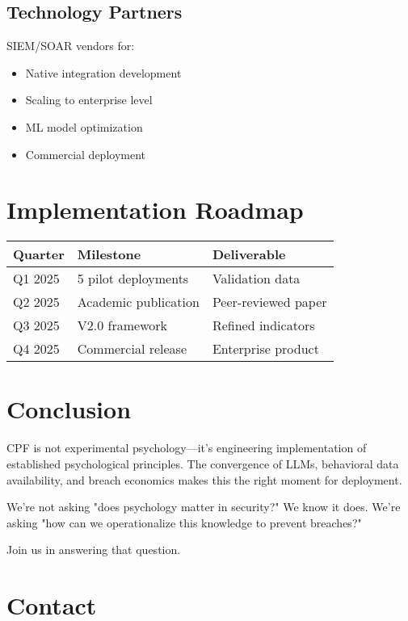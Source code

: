 \documentclass[11pt,a4paper]{article}
\begin{document}
\subsection{Technology Partners}
SIEM/SOAR vendors for:
\begin{itemize}
\item Native integration development
\item Scaling to enterprise level
\item ML model optimization
\item Commercial deployment
\end{itemize}

\section{Implementation Roadmap}

\begin{table}[h]
\centering
\begin{tabular}{|l|l|l|}
\hline
\textbf{Quarter} & \textbf{Milestone} & \textbf{Deliverable} \\
\hline
Q1 2025 & 5 pilot deployments & Validation data \\
Q2 2025 & Academic publication & Peer-reviewed paper \\
Q3 2025 & V2.0 framework & Refined indicators \\
Q4 2025 & Commercial release & Enterprise product \\
\hline
\end{tabular}
\end{table}

\section{Conclusion}

CPF is not experimental psychology—it's engineering implementation of 
established psychological principles. The convergence of LLMs, behavioral 
data availability, and breach economics makes this the right moment for 
deployment.

We're not asking "does psychology matter in security?" We know it does. 
We're asking "how can we operationalize this knowledge to prevent breaches?"

Join us in answering that question.

\section*{Contact}
\end{document}

